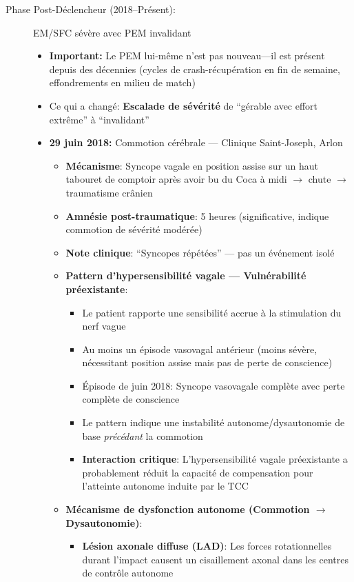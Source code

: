 \begin{description}
    \item[Phase Post-Déclencheur (2018--Présent):] EM/SFC sévère avec PEM invalidant
    \begin{itemize}
        \item \textbf{Important:} Le PEM lui-même n'est pas nouveau---il est présent depuis des décennies (cycles de crash-récupération en fin de semaine, effondrements en milieu de match)
        \item Ce qui a changé: \textbf{Escalade de sévérité} de ``gérable avec effort extrême'' à ``invalidant''
        \item \textbf{29 juin 2018:} Commotion cérébrale --- Clinique Saint-Joseph, Arlon
        \begin{itemize}
            \item \textbf{Mécanisme}: Syncope vagale en position assise sur un haut tabouret de comptoir après avoir bu du Coca à midi $\rightarrow$ chute $\rightarrow$ traumatisme crânien
            \item \textbf{Amnésie post-traumatique}: 5 heures (significative, indique commotion de sévérité modérée)
            \item \textbf{Note clinique}: ``Syncopes répétées'' --- pas un événement isolé
            \item \textbf{Pattern d'hypersensibilité vagale --- Vulnérabilité préexistante}:
            \begin{itemize}
                \item Le patient rapporte une sensibilité accrue à la stimulation du nerf vague
                \item Au moins un épisode vasovagal antérieur (moins sévère, nécessitant position assise mais pas de perte de conscience)
                \item Épisode de juin 2018: Syncope vasovagale complète avec perte complète de conscience
                \item Le pattern indique une instabilité autonome/dysautonomie de base \emph{précédant} la commotion
                \item \textbf{Interaction critique}: L'hypersensibilité vagale préexistante a probablement réduit la capacité de compensation pour l'atteinte autonome induite par le TCC
            \end{itemize}
            \item \textbf{Mécanisme de dysfonction autonome (Commotion $\rightarrow$ Dysautonomie)}:
            \begin{itemize}
                \item \textbf{Lésion axonale diffuse (LAD)}: Les forces rotationnelles durant l'impact causent un cisaillement axonal dans les centres de contrôle autonome

\end{itemize}
\end{itemize}
\end{itemize}
\end{description}
